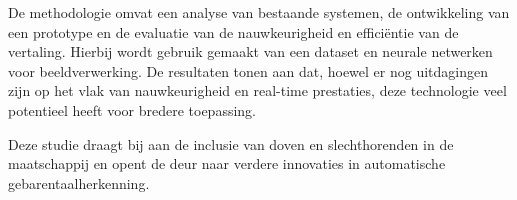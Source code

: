 De methodologie omvat een analyse van bestaande systemen, de ontwikkeling van een prototype en de evaluatie van de nauwkeurigheid en efficiëntie van de vertaling. 
Hierbij wordt gebruik gemaakt van een dataset en neurale netwerken voor beeldverwerking.
De resultaten tonen aan dat, hoewel er nog uitdagingen zijn op het vlak van nauwkeurigheid en real-time prestaties, deze technologie veel potentieel heeft voor bredere toepassing.

Deze studie draagt bij aan de inclusie van doven en slechthorenden in de maatschappij en opent de deur naar verdere innovaties in automatische gebarentaalherkenning.